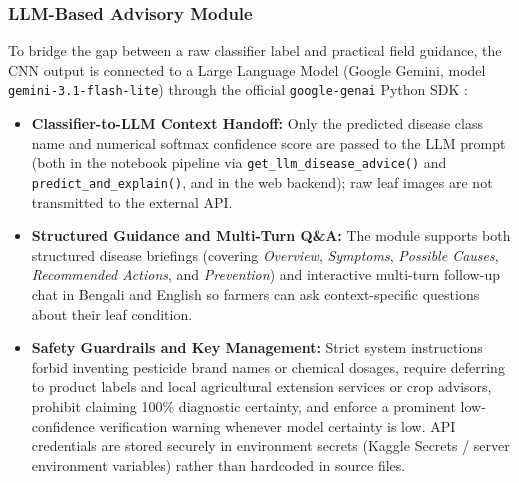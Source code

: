 \subsubsection{LLM-Based Advisory Module}
To bridge the gap between a raw classifier label and practical field guidance, the CNN output is connected to a Large Language Model (Google Gemini, model \texttt{gemini-3.1-flash-lite}) through the official \texttt{google-genai} Python SDK \cite{google2026gemini}:
\begin{itemize}
    \item \textbf{Classifier-to-LLM Context Handoff:} Only the predicted disease class name and numerical softmax confidence score are passed to the LLM prompt (both in the notebook pipeline via \texttt{get\_llm\_disease\_advice()} and \texttt{predict\_and\_explain()}, and in the web backend); raw leaf images are not transmitted to the external API.
    \item \textbf{Structured Guidance and Multi-Turn Q\&A:} The module supports both structured disease briefings (covering \textit{Overview}, \textit{Symptoms}, \textit{Possible Causes}, \textit{Recommended Actions}, and \textit{Prevention}) and interactive multi-turn follow-up chat in Bengali and English so farmers can ask context-specific questions about their leaf condition.
    \item \textbf{Safety Guardrails and Key Management:} Strict system instructions forbid inventing pesticide brand names or chemical dosages, require deferring to product labels and local agricultural extension services or crop advisors, prohibit claiming 100\% diagnostic certainty, and enforce a prominent low-confidence verification warning whenever model certainty is low. API credentials are stored securely in environment secrets (Kaggle Secrets / server environment variables) rather than hardcoded in source files.
\end{itemize}

